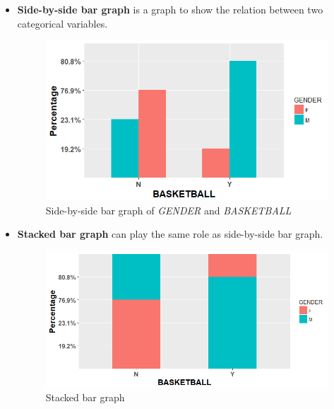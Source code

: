 \documentclass[a4paper, 12pt,twoside]{book}
\begin{document}
\begin{itemize}
\item \textbf{Side-by-side bar graph} is a graph to show the relation between two categorical variables.

\begin{figure}[H]
\centering
\includegraphics[scale=0.5]{Side-by-sideBarGraph.png}
\caption{Side-by-side bar graph of \textit{GENDER} and \textit{BASKETBALL}}
\label{Side-by-sideBarGraph}
\end{figure}

\item \textbf{Stacked bar graph} can play the same role as side-by-side bar graph.

\begin{figure}[H]
\centering
\includegraphics[scale=0.45]{StackedBarGraph.png}
\caption{Stacked bar graph}
\label{StackedBarGraph}
\end{figure}

\end{itemize}
\newpage
\end{document}
